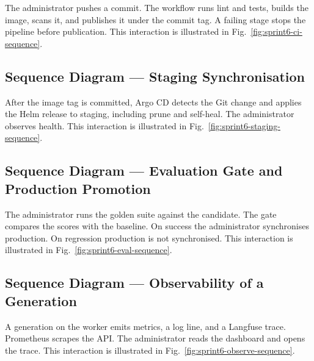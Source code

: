 The administrator pushes a commit. The workflow runs lint and tests, builds the image, scans it, and publishes it under the commit tag. A failing stage stops the pipeline before publication. This interaction is illustrated in Fig.~\ref{fig:sprint6-ci-sequence}.


\subsection{Sequence Diagram --- Staging Synchronisation}

After the image tag is committed, Argo CD detects the Git change and applies the Helm release to staging, including prune and self-heal. The administrator observes health. This interaction is illustrated in Fig.~\ref{fig:sprint6-staging-sequence}.


\subsection{Sequence Diagram --- Evaluation Gate and Production Promotion}

The administrator runs the golden suite against the candidate. The gate compares the scores with the baseline. On success the administrator synchronises production. On regression production is not synchronised. This interaction is illustrated in Fig.~\ref{fig:sprint6-eval-sequence}.


\subsection{Sequence Diagram --- Observability of a Generation}

A generation on the worker emits metrics, a log line, and a Langfuse trace. Prometheus scrapes the API. The administrator reads the dashboard and opens the trace. This interaction is illustrated in Fig.~\ref{fig:sprint6-observe-sequence}.


